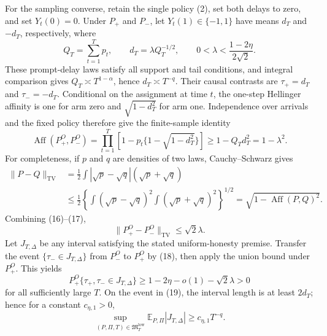 For the sampling converse, retain the single policy (2), set both delays to zero, and set \(Y_t(0)=0\).  Under \(P_+\) and \(P_-\), let \(Y_t(1)\in\{-1,1\}\) have means \(d_T\) and \(-d_T\), respectively, where
\[
 Q_T=\sum_{t=1}^T p_t,
 \qquad d_T=\lambda Q_T^{-1/2},
 \qquad 0<\lambda<\frac{1-2\eta}{2\sqrt2}.
 \tag{15}
\]
These prompt-delay laws satisfy all support and tail conditions, and integral comparison gives \(Q_T\asymp T^{1-\alpha}\), hence \(d_T\asymp T^{-q}\).  Their causal contrasts are \(\tau_+=d_T\) and \(\tau_-=-d_T\).  Conditional on the assignment at time \(t\), the one-step Hellinger affinity is one for arm zero and \(\sqrt{1-d_T^2}\) for arm one.  Independence over arrivals and the fixed policy therefore give the finite-sample identity
\[
 \operatorname{Aff}(P_+^O,P_-^O)
 =\prod_{t=1}^T\left[1-p_t\{1-\sqrt{1-d_T^2}\}\right]
 \geq1-Q_Td_T^2=1-\lambda^2.
 \tag{16}
\]
For completeness, if \(p\) and \(q\) are densities of two laws, Cauchy--Schwarz gives
\[
 \begin{aligned}
 \|P-Q\|_{\mathrm{TV}}
 &=\frac12\int|\sqrt p-\sqrt q|(\sqrt p+\sqrt q)\\
 &\leq\frac12
 \left\{\int(\sqrt p-\sqrt q)^2
             \int(\sqrt p+\sqrt q)^2\right\}^{1/2}
 =\sqrt{1-\operatorname{Aff}(P,Q)^2}.
 \end{aligned}
 \tag{17}
\]
Combining (16)--(17),
\[
 \|P_+^O-P_-^O\|_{\mathrm{TV}}\leq\sqrt2\lambda.
 \tag{18}
\]
Let \(J_{T,\Delta}\) be any interval satisfying the stated uniform-honesty premise.  Transfer the event \(\{\tau_-\in J_{T,\Delta}\}\) from \(P_-^O\) to \(P_+^O\) by (18), then apply the union bound under \(P_+^O\).  This yields
\[
 P_+^O\{\tau_+,\tau_-\in J_{T,\Delta}\}
 \geq1-2\eta-o(1)-\sqrt2\lambda>0
 \tag{19}
\]
for all sufficiently large \(T\).  On the event in (19), the interval length is at least \(2d_T\); hence for a constant \(c_{\eta,1}>0\),
\[
 \sup_{(P,\Pi,T)\in\mathfrak M_T^{\mathrm{low}}}
 \mathbb E_{P,\Pi}|J_{T,\Delta}|
 \geq c_{\eta,1}T^{-q}.
 \tag{20}
\]


